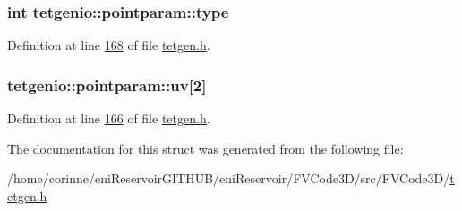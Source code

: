 \subsubsection[{\texorpdfstring{type}{type}}]{\setlength{\rightskip}{0pt plus 5cm}int tetgenio\+::pointparam\+::type}\hypertarget{structtetgenio_1_1pointparam_a172c5af02af4fe6ab385df812c1ea1ff}{}\label{structtetgenio_1_1pointparam_a172c5af02af4fe6ab385df812c1ea1ff}


Definition at line \hyperlink{tetgen_8h_source_l00168}{168} of file \hyperlink{tetgen_8h_source}{tetgen.\+h}.

\subsubsection[{\texorpdfstring{uv}{uv}}]{ tetgenio\+::pointparam\+::uv\mbox{[}2\mbox{]}}\hypertarget{structtetgenio_1_1pointparam_a043a61660f4b9f0e164c91692fdb0ee5}{}\label{structtetgenio_1_1pointparam_a043a61660f4b9f0e164c91692fdb0ee5}


Definition at line \hyperlink{tetgen_8h_source_l00166}{166} of file \hyperlink{tetgen_8h_source}{tetgen.\+h}.



The documentation for this struct was generated from the following file\+:\begin{DoxyCompactItemize}
\item 
/home/corinne/eni\+Reservoir\+G\+I\+T\+H\+U\+B/eni\+Reservoir/\+F\+V\+Code3\+D/src/\+F\+V\+Code3\+D/\hyperlink{tetgen_8h}{tetgen.\+h}\end{DoxyCompactItemize}
